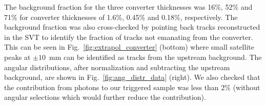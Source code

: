 The background fraction for the three converter thicknesses was 16\%, 52\% and 71\% 
for converter thicknesses of 1.6\%, 0.45\% and 0.18\%, respectively. The background fraction was also 
cross-checked by pointing back tracks reconstructed in the SVT to identify the fraction of tracks not emanating from the converter. This can be seen in Fig.~\ref{fig:extrapol_converter} (bottom) where small 
satellite peaks at $\pm 10$~mm can be identified as tracks from the upstream background. The angular distributions, after normalization and subtracting the upstream background, are shown in 
Fig.~\ref{fig:ang_distr_data} (right).  We also checked that the contribution from photons to our triggered 
sample was less than 2\% (without angular selections which would further reduce the contribution).


